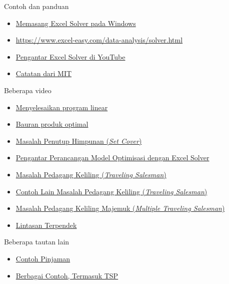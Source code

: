 \begin{resource}
Contoh dan panduan
\begin{itemize}
\item \href{https://www.youtube.com/watch?v=LKV6fT8xApA&ab_channel=JoshuaEmmanuel}{Memasang Excel Solver pada Windows}
\item \url{https://www.excel-easy.com/data-analysis/solver.html}
\item \href{https://www.youtube.com/watch?v=dRm5MEoA3OI&ab_channel=LeilaGharani}{Pengantar Excel Solver di YouTube}

\item \href{https://ocw.mit.edu/courses/sloan-school-of-management/15-053-optimization-methods-in-management-science-spring-2013/tutorials/MIT15_053S13_tut03.pdf}{Catatan dari MIT}
\end{itemize}
Beberapa video
\begin{itemize}
\item \href{https://www.youtube.com/watch?v=V5DmekIFenA}{Menyelesaikan program linear}
\item \href{https://www.youtube.com/watch?v=6xa1x_Iqjzg}{Bauran produk optimal}
\item \href{https://www.youtube.com/watch?v=vpodCzRtUMU}{Masalah Penutup Himpunan (\emph{Set Cover})}

\item \href{https://www.youtube.com/watch?v=tKV24jzZ10s}{Pengantar Perancangan Model Optimisasi dengan Excel Solver}

\item \href{https://www.youtube.com/watch?v=-E3rSoClgMI}{Masalah Pedagang Keliling (\emph{Traveling Salesman})}

\item \href{https://www.youtube.com/watch?v=UQYJvSjXE6I}{Contoh Lain Masalah Pedagang Keliling (\emph{Traveling Salesman})}

\item \href{https://www.youtube.com/watch?v=owHq3Mbniqo}{Masalah Pedagang Keliling Majemuk (\emph{Multiple Traveling Salesman})}

\item \href{https://www.youtube.com/watch?v=JkZkGxVZ8ao}{Lintasan Terpendek}

\end{itemize}
Beberapa tautan lain
\begin{itemize}
\item \href{https://github.com/lobodemonte/excel-solver-loan-example}{Contoh Pinjaman}

\item \href{https://github.com/Bhargavanarasimhan/Excel-Solver-Files}{Berbagai Contoh, Termasuk TSP}
\end{itemize}
\end{resource}

